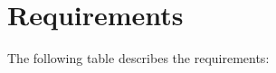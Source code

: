 \chapter*{Requirements}

The following table describes the requirements:

\begin{table}

\end{table}
